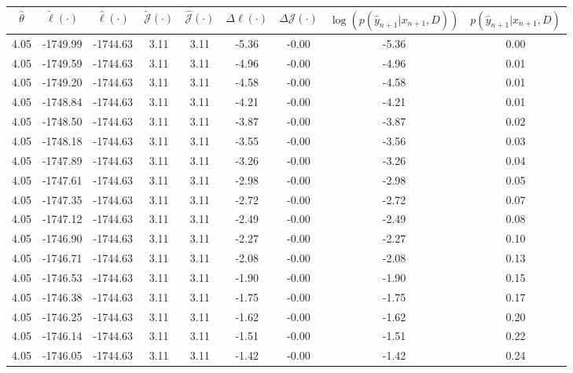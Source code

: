 \begin{table}[htbp]
        \centering
        \tiny
        \begin{adjustbox}{angle=90}
            \begin{tabular}{|c|c|c|c|c|c|c|c|c|}
                \hline
                 $\hat{\theta}$ & $\tilde{\ell}(\cdot)$ & $\hat{\ell}(\cdot)$ & $\tilde{\mathcal{J}}(\cdot)$ & $\hat{\mathcal{J}}(\cdot)$ & $\Delta \ell(\cdot)$ & $\Delta \mathcal{J}(\cdot)$ & $\log(p(\hat{y}_{n+1}|x_{n+1}, D))$ & $p(\hat{y}_{n+1}|x_{n+1}, D)$ \\
                \hline
                 4.05 & -1749.99 & -1744.63 & 3.11 & 3.11 & -5.36 & -0.00 & -5.36 & 0.00\\ \hline
 4.05 & -1749.59 & -1744.63 & 3.11 & 3.11 & -4.96 & -0.00 & -4.96 & 0.01\\ \hline
 4.05 & -1749.20 & -1744.63 & 3.11 & 3.11 & -4.58 & -0.00 & -4.58 & 0.01\\ \hline
 4.05 & -1748.84 & -1744.63 & 3.11 & 3.11 & -4.21 & -0.00 & -4.21 & 0.01\\ \hline
 4.05 & -1748.50 & -1744.63 & 3.11 & 3.11 & -3.87 & -0.00 & -3.87 & 0.02\\ \hline
 4.05 & -1748.18 & -1744.63 & 3.11 & 3.11 & -3.55 & -0.00 & -3.56 & 0.03\\ \hline
 4.05 & -1747.89 & -1744.63 & 3.11 & 3.11 & -3.26 & -0.00 & -3.26 & 0.04\\ \hline
 4.05 & -1747.61 & -1744.63 & 3.11 & 3.11 & -2.98 & -0.00 & -2.98 & 0.05\\ \hline
 4.05 & -1747.35 & -1744.63 & 3.11 & 3.11 & -2.72 & -0.00 & -2.72 & 0.07\\ \hline
 4.05 & -1747.12 & -1744.63 & 3.11 & 3.11 & -2.49 & -0.00 & -2.49 & 0.08\\ \hline
 4.05 & -1746.90 & -1744.63 & 3.11 & 3.11 & -2.27 & -0.00 & -2.27 & 0.10\\ \hline
 4.05 & -1746.71 & -1744.63 & 3.11 & 3.11 & -2.08 & -0.00 & -2.08 & 0.13\\ \hline
 4.05 & -1746.53 & -1744.63 & 3.11 & 3.11 & -1.90 & -0.00 & -1.90 & 0.15\\ \hline
 4.05 & -1746.38 & -1744.63 & 3.11 & 3.11 & -1.75 & -0.00 & -1.75 & 0.17\\ \hline
 4.05 & -1746.25 & -1744.63 & 3.11 & 3.11 & -1.62 & -0.00 & -1.62 & 0.20\\ \hline
 4.05 & -1746.14 & -1744.63 & 3.11 & 3.11 & -1.51 & -0.00 & -1.51 & 0.22\\ \hline
 4.05 & -1746.05 & -1744.63 & 3.11 & 3.11 & -1.42 & -0.00 & -1.42 & 0.24\\ \hline

\end{tabular}
\end{adjustbox}
\end{table}
